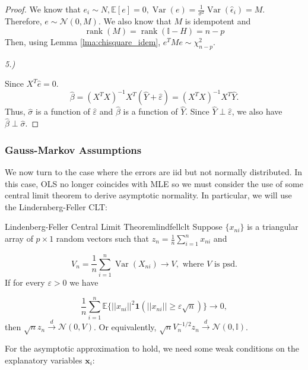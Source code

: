 \documentclass[11pt, %
	oneside, %
	english, %
	onehalfspacing, %
	]{article} %
\numberwithin{equation}{section}
\begin{document}
\begin{proof}
We know that $e_i \sim N, \mathbb{E} \left[ e\right] =0, \operatorname{Var} \left( e\right) = \frac{1}{\sigma^2} \operatorname{Var} (\hat{\epsilon}_i) = M$. Therefore, $e \sim \mathcal{N}(0, M)$. We also know that $M$ is idempotent and
$$
\operatorname{ rank } (M) = \operatorname{ rank } (\mathbb{I}-H) = n-p
$$
Then, using Lemma \ref{lma:chisquare_idem}, $e^T M e \sim \chi^2_{n-p}$.


\emph{5.)}

Since $X^T\hat{e} = 0$.
$$
\hat{\beta} = (X^T X)^{-1} X^T (\hat{Y} + \hat{\varepsilon}) = (X^TX)^{-1} X^T \hat{Y}.
$$
Thus, $\hat{\sigma}$ is a function of $\hat{\varepsilon}$ and $\hat{\beta}$ is a function of $\hat{Y}$. Since $\hat{Y} \perp \hat{\varepsilon}$, we also have $\hat{\beta} \perp \hat{\sigma}$.



\end{proof}




\subsubsection*{Gauss-Markov Assumptions}

We now turn to the case where the errors are iid but not normally distributed. In this case, OLS no longer coincides with MLE so we must consider the use of some central limit theorem to derive asymptotic normality. In particular, we will use the Lindernberg-Feller CLT:

\begin{theorem}{Lindenberg-Feller Central Limit Theorem}{lindfellclt}
    Suppose $\{ x_{ni} \}$ is a triangular array of $p \times 1$ random vectors such that $z_n = \frac{1}{n} \sum_{ i =1 }^{ n } x_{ni}$ and

    $$
    V_n = \frac{1}{n} \sum_{ i=1 }^{ n }  \operatorname{Var} \left( X_{ni}\right) \to V, \text{ where }V \text{ is psd.}
    $$
    If for every $\varepsilon > 0$ we have

    $$
    \frac{1}{n} \sum_{ i = 1 }^{ n } \mathbb{E} \bigg\{ ||x_{ni}||^2 \mathbf{1} \left( ||x_{ni}||  \geq \varepsilon \sqrt{ n } \right)  \bigg\} \to 0,
    $$
    then $\sqrt{ n } z_n \overset{d}{\to} \mathcal{N}(0,V)$. Or equivalently, $\sqrt{ n } V_n^{-1/2} z_n \overset{d}{\to} \mathcal{N}(0, \mathbb{I})$.
\end{theorem}

For the asymptotic approximation to hold, we need some weak conditions on the explanatory variables $\mathbf{x}_i$:
\end{document}
